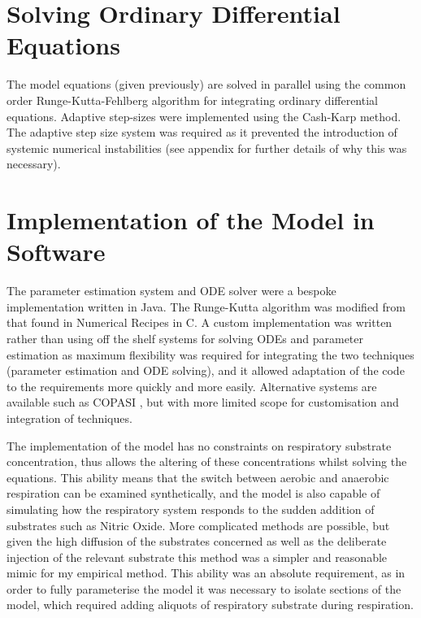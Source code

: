 \section{Solving Ordinary Differential Equations}
The model equations (given previously) are solved in parallel using the common  order Runge-Kutta-Fehlberg algorithm for integrating ordinary differential equations\cite{Butcher2003}. Adaptive step-sizes were implemented using the Cash-Karp method\cite{Cash1990}. The adaptive step size system was required as it prevented the introduction of systemic numerical instabilities (see appendix for further details of why this was necessary).


\section{Implementation of the Model in Software}
The parameter estimation system and ODE solver were a bespoke implementation written in Java. The Runge-Kutta algorithm was modified from that found in Numerical Recipes in C\cite{Press1992}. A custom implementation was written rather than using off the shelf systems for solving ODEs and parameter estimation as maximum flexibility was required for integrating the two techniques (parameter estimation and ODE solving), and it allowed adaptation of the code to the requirements more quickly and more easily. Alternative systems are available such as COPASI \cite{Hoops2006}, but with more limited scope for customisation and integration of techniques.

The implementation of the model has no constraints on respiratory substrate concentration, thus allows the altering of these concentrations whilst solving the equations. %
This ability means that the switch between aerobic and anaerobic respiration can be examined synthetically, and the model is also capable of simulating how the respiratory system responds to the sudden addition of substrates such as Nitric Oxide. More complicated methods are possible, but given the high diffusion of the substrates concerned as well as the deliberate injection of the relevant substrate this method was a simpler and reasonable mimic for my empirical method. This ability was an absolute requirement, as in order to fully parameterise the model it was necessary to isolate sections of the model, which required adding aliquots of respiratory substrate during respiration.


